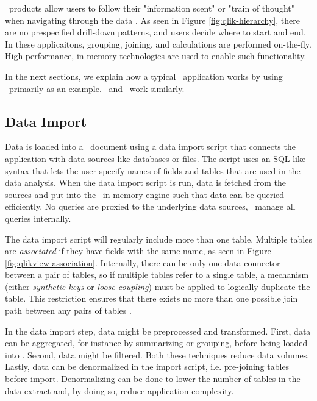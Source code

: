 \bd~products allow users to follow their "information scent" or "train of thought" when navigating through the data \cite{Kamkolkar2015-iq, Qlik2014-vd}. As seen in Figure \ref{fig:qlik-hierarchy}, there are no prespecified drill-down patterns, and users decide where to start and end. In these applicaitons, grouping, joining, and calculations are performed on-the-fly. High-performance, in-memory technologies are used to enable such functionality. 

In the next sections, we explain how a typical \bd~application works by using \qlikview~primarily as an example. \tableau~and \powerpivot~work similarly.

\subsection{Data Import}
\label{sub:Data Import}
Data is loaded into a \qlikview~document using a data import script that connects the application with data sources like databases or files. The script uses an SQL-like syntax that lets the user specify names of fields and tables that are used in the data analysis. When the data import script is run, data is fetched from the sources and put into the \qlikview~in-memory engine such that data can be queried efficiently. No queries are proxied to the underlying data sources, \qlikview~manage all queries internally.


The data import script will regularly include more than one table. Multiple tables are \textit{associated} if they have fields with the same name, as seen in Figure \ref{fig:qlikview-association}. Internally, there can be only one data connector between a pair of tables, so if multiple tables refer to a single table, a mechanism (either \textit{synthetic keys} or \textit{loose coupling}) must be applied to logically duplicate the table. This restriction ensures that there exists no more than one possible join path between any pairs of tables \cite{noauthor_undated-js}.

In the data import step, data might be preprocessed and transformed. First, data can be aggregated, for instance by summarizing or grouping, before being loaded into \qlikview. Second, data might be filtered. Both these techniques reduce data volumes. Lastly, data can be denormalized in the import script, i.e. pre-joining tables before import. Denormalizing can be done to lower the number of tables in the data extract and, by doing so, reduce application complexity.

